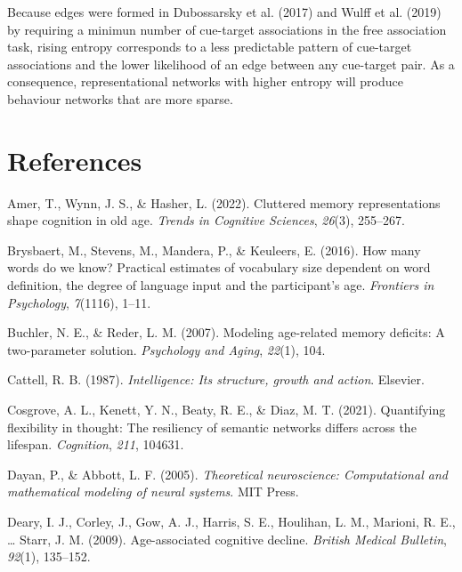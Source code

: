 \documentclass[
  man]{apa6}
\newlength{\cslhangindent}
\newlength{\cslentryspacingunit} %
\newenvironment{CSLReferences}[2] %
 {%
  \setlength{\parindent}{0pt}
  \ifodd #1
  \let\oldpar\par
  \def\par{\hangindent=\cslhangindent\oldpar}
  \fi
  \setlength{\parskip}{#2\cslentryspacingunit}
 }%
 {}
\begin{document}
Because edges were formed in Dubossarsky et al. (2017) and Wulff et al. (2019) by requiring a minimun number of cue-target associations in the free association task, rising entropy corresponds to a less predictable pattern of cue-target associations and the lower likelihood of an edge between any cue-target pair. As a consequence, representational networks with higher entropy will produce behaviour networks that are more sparse.

\newpage

\hypertarget{references}{%
\section{References}\label{references}}

\hypertarget{refs}{}
\begin{CSLReferences}{1}{0}
\leavevmode{}%
Amer, T., Wynn, J. S., \& Hasher, L. (2022). Cluttered memory representations shape cognition in old age. \emph{Trends in Cognitive Sciences}, \emph{26}(3), 255--267.

\leavevmode{}%
Brysbaert, M., Stevens, M., Mandera, P., \& Keuleers, E. (2016). How many words do we know? Practical estimates of vocabulary size dependent on word definition, the degree of language input and the participant's age. \emph{Frontiers in Psychology}, \emph{7}(1116), 1--11.

\leavevmode{}%
Buchler, N. E., \& Reder, L. M. (2007). Modeling age-related memory deficits: A two-parameter solution. \emph{Psychology and Aging}, \emph{22}(1), 104.

\leavevmode{}%
Cattell, R. B. (1987). \emph{Intelligence: Its structure, growth and action}. Elsevier.

\leavevmode{}%
Cosgrove, A. L., Kenett, Y. N., Beaty, R. E., \& Diaz, M. T. (2021). Quantifying flexibility in thought: The resiliency of semantic networks differs across the lifespan. \emph{Cognition}, \emph{211}, 104631.

\leavevmode{}%
Dayan, P., \& Abbott, L. F. (2005). \emph{Theoretical neuroscience: Computational and mathematical modeling of neural systems}. MIT Press.

\leavevmode{}%
Deary, I. J., Corley, J., Gow, A. J., Harris, S. E., Houlihan, L. M., Marioni, R. E., \ldots{} Starr, J. M. (2009). Age-associated cognitive decline. \emph{British Medical Bulletin}, \emph{92}(1), 135--152.


\end{CSLReferences}
\end{document}
